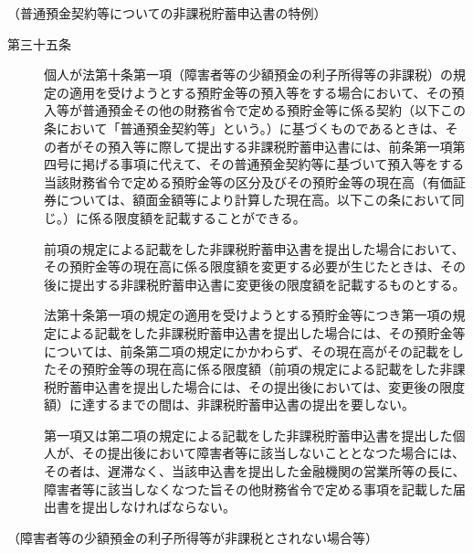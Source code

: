 \documentclass[twocolumn,a4j,10pt]{ltjtarticle}
\begin{document}
\noindent\hspace{10pt}（普通預金契約等についての非課税貯蓄申込書の特例）
\begin{description}
\item[第三十五条]個人が法第十条第一項（障害者等の少額預金の利子所得等の非課税）の規定の適用を受けようとする預貯金等の預入等をする場合において、その預入等が普通預金その他の財務省令で定める預貯金等に係る契約（以下この条において「普通預金契約等」という。）に基づくものであるときは、その者がその預入等に際して提出する非課税貯蓄申込書には、前条第一項第四号に掲げる事項に代えて、その普通預金契約等に基づいて預入等をする当該財務省令で定める預貯金等の区分及びその預貯金等の現在高（有価証券については、額面金額等により計算した現在高。以下この条において同じ。）に係る限度額を記載することができる。
\item[]前項の規定による記載をした非課税貯蓄申込書を提出した場合において、その預貯金等の現在高に係る限度額を変更する必要が生じたときは、その後に提出する非課税貯蓄申込書に変更後の限度額を記載するものとする。
\item[]法第十条第一項の規定の適用を受けようとする預貯金等につき第一項の規定による記載をした非課税貯蓄申込書を提出した場合には、その預貯金等については、前条第二項の規定にかかわらず、その現在高がその記載をしたその預貯金等の現在高に係る限度額（前項の規定による記載をした非課税貯蓄申込書を提出した場合には、その提出後においては、変更後の限度額）に達するまでの間は、非課税貯蓄申込書の提出を要しない。
\item[]第一項又は第二項の規定による記載をした非課税貯蓄申込書を提出した個人が、その提出後において障害者等に該当しないこととなつた場合には、その者は、遅滞なく、当該申込書を提出した金融機関の営業所等の長に、障害者等に該当しなくなつた旨その他財務省令で定める事項を記載した届出書を提出しなければならない。
\end{description}
\noindent\hspace{10pt}（障害者等の少額預金の利子所得等が非課税とされない場合等）
\end{document}
